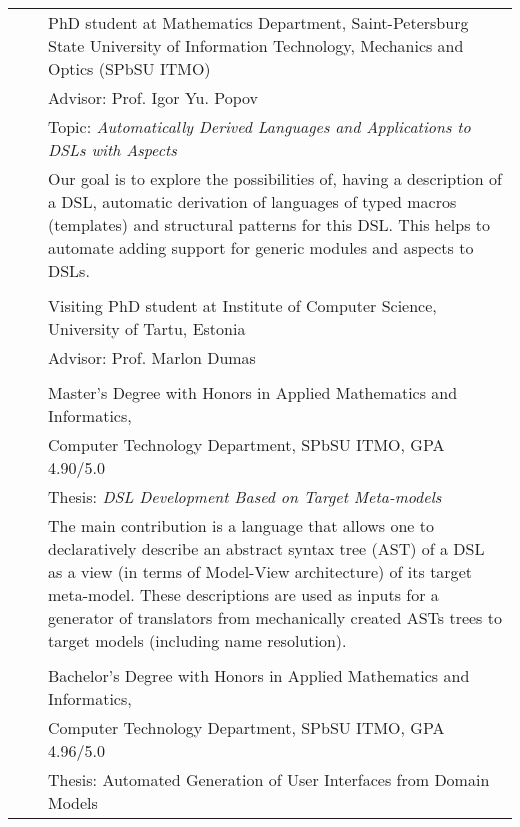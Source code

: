 \documentclass[a4paper, 12pt]{article}
\begin{document}
\begin{tabular*}{1.0\textwidth}[t]{p{70pt} l p{370pt}}
	\raggedleft{since 2007}&\hspace{10pt}&PhD student at Mathematics Department, Saint-Petersburg State University of Information Technology, Mechanics and Optics (SPbSU ITMO)\\
	&&Advisor: Prof. Igor Yu. Popov \\
	&&Topic: \textit{Automatically Derived Languages and Applications to DSLs with Aspects}\\
	&&Our goal is to explore the possibilities of, having a description of a DSL,
	  automatic derivation of languages of typed macros (templates) and structural patterns
	  for this DSL. This helps to automate adding support for generic modules and aspects to DSLs. \\
	&&\\
	\raggedleft{2009 -- 2010}&& Visiting PhD student at Institute of Computer Science, University of Tartu, Estonia\\
	&&Advisor: Prof. Marlon Dumas \\
	&&\\
	\raggedleft{2007} && Master's Degree with Honors in Applied Mathematics and Informatics, \\
	&&Computer Technology Department, SPbSU ITMO, GPA 4.90/5.0\\
	&&Thesis: \textit{DSL Development Based on Target Meta-models}\\
	&&The main contribution is a language that allows one to declaratively describe an abstract syntax tree (AST) of a 
	  DSL as a view (in terms of Model-View architecture) of its target meta-model. These descriptions are
	  used as inputs for a generator of translators from mechanically created ASTs trees to target models 
	  (including name resolution). \\
	&&\\
	\raggedleft{2005} && Bachelor's Degree with Honors in Applied Mathematics and Informatics, \\
	&&Computer Technology Department, SPbSU ITMO, GPA 4.96/5.0\\
	&&Thesis: Automated Generation of User Interfaces from Domain Models\\
\end{tabular*}
\end{document}
